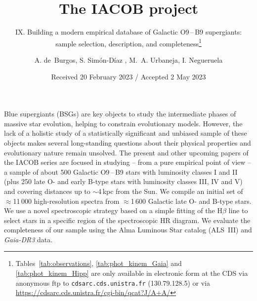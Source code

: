 \documentclass{aa}
\begin{document}
%
\title{The IACOB project}
%
\subtitle{IX. Building a modern empirical database of Galactic O9\,--\,B9 supergiants:\\sample selection, description, and completeness\thanks{Tables~\ref{tab:observations}, \ref{tab:phot_kinem_Gaia} and \ref{tab:phot_kinem_Hipp} are only available in electronic form at the CDS via anonymous ftp to {\tt cdsarc.cds.unistra.fr} (130.79.128.5) or via \url{https://cdsarc.cds.unistra.fr/cgi-bin/qcat?J/A+A/}}}
%
%
\author{A. de~Burgos, S. Sim\'on-D\'iaz , M.~A. Urbaneja\inst{3\orcidC{}}, I. Negueruela\inst{4\orcidD{}}}
%
%
%
\date{Received 20 February 2023 / Accepted 2 May 2023}
\abstract 
{Blue supergiants (BSGs) are key objects to study the intermediate phases of massive star evolution, helping to constrain evolutionary models. However, the lack of a holistic study of a statistically significant and unbiased sample of these objects makes several long-standing questions about their physical properties and evolutionary nature remain unsolved.
}
{The present and other upcoming papers of the IACOB series are focused in studying -- from a pure empirical point of view -- a sample of about 500 Galactic O9\,--\,B9 stars with luminosity classes I and II (plus 250 late O- and early B-type stars with luminosity classes III, IV and V) and covering distances up to $\sim$4\,kpc from the Sun.
}
{We compile an initial set of $\approx$11\,000 high-resolution spectra from $\approx$1\,600 Galactic late O- and B-type stars. We use a novel spectroscopic strategy based on a simple fitting of the H$\beta$ line to select stars in a specific region of the spectroscopic HR diagram. We evaluate the completeness of our sample using the Alma Luminous Star catalog (ALS~III) and {\em Gaia-DR3} data.
}
\end{document}
